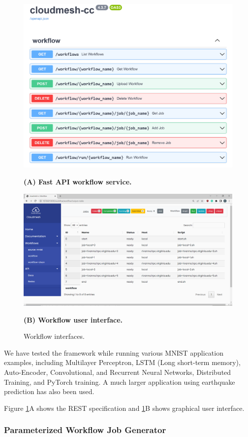 \documentclass[utf8]{FrontiersinVancouver} %
\begin{document}
\begin{figure}[htb]
  \centering\includegraphics[width=0.8\columnwidth]{images/fastapi-service-highres.png}
  
  {\bf (A) Fast API workflow service.}

  \bigskip


    \centering\includegraphics[width=0.8\columnwidth]{images/cc-1.png}

    {\bf (B) Workflow user interface.}

    \caption{Workflow interfaces.}
    \label{fig:cc-3}
\end{figure}


We have tested the framework while running various MNIST application
examples, including Multilayer Perceptron, LSTM (Long short-term
memory), Auto-Encoder, Convolutional, and Recurrent Neural Networks,
Distributed Training, and PyTorch training.  A much larger application
using earthquake prediction has also been used.

Figure \ref{fig:cc-3}A shows the REST specification and
\ref{fig:cc-3}B shows graphical user interface.

\subsubsection{Parameterized Workflow Job Generator}
\label{sec:workflow-sbatch}
\end{document}
